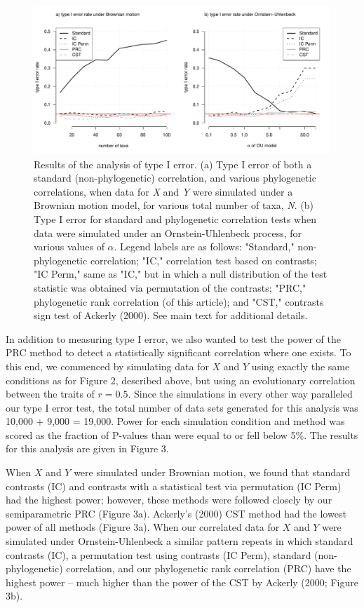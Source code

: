 \documentclass[fleqn,10pt,lineno]{wlpeerj} %
\begin{document}
\begin{figure}
\includegraphics[width=1\linewidth]{Harmon-and-Revell_NonParametricPCM.PeerJ_files/figure-latex/Harmon-fig2-1} \caption{Results of the analysis of type I error. (a) Type I error of both a standard (non-phylogenetic) correlation, and various phylogenetic correlations, when data for \emph{X} and \emph{Y} were simulated under a Brownian motion model, for various total number of taxa, \emph{N}. (b) Type I error for standard and phylogenetic correlation tests when data were simulated under an Ornstein-Uhlenbeck process, for various values of $\alpha$. Legend labels are as follows: "Standard," non-phylogenetic correlation; "IC," correlation test based on contrasts; "IC Perm," same as "IC," but in which a null distribution of the test statistic was obtained via permutation of the contrasts; "PRC," phylogenetic rank correlation (of this article); and "CST," contrasts sign test of Ackerly (2000). See main text for additional details.}\label{fig:Harmon-fig2}
\end{figure}

In addition to measuring type I error, we also wanted to test the power of the PRC method to detect a statistically significant correlation where one exists. To this end, we commenced by simulating data for \(X\) and \(Y\) using exactly the same conditions as for Figure 2, described above, but using an evolutionary correlation between the traits of \(r = 0.5\). Since the simulations in every other way paralleled our type I error test, the total number of data sets generated for this analysis was 10,000 \(+\) 9,000 = 19,000. Power for each simulation condition and method was scored as the fraction of P-values than were equal to or fell below 5\%. The results for this analysis are given in Figure 3.

When \(X\) and \(Y\) were simulated under Brownian motion, we found that standard contrasts (IC) and contrasts with a statistical test via permutation (IC Perm) had the highest power; however, these methods were followed closely by our semiparametric PRC (Figure 3a). Ackerly's (2000) CST method had the lowest power of all methods (Figure 3a). When our correlated data for \(X\) and \(Y\) were simulated under Ornstein-Uhlenbeck a similar pattern repeats in which standard contrasts (IC), a permutation test using contrasts (IC Perm), standard (non-phylogenetic) correlation, and our phylogenetic rank correlation (PRC) have the highest power -- much higher than the power of the CST by Ackerly (2000; Figure 3b).
\end{document}
